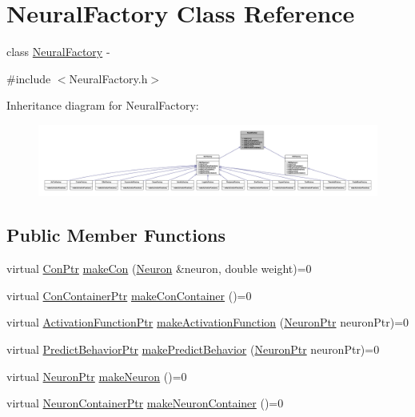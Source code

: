 \hypertarget{class_neural_factory}{
\section{NeuralFactory Class Reference}
\label{class_neural_factory}
}


class \hyperlink{class_neural_factory}{NeuralFactory} -\/  




{\ttfamily \#include $<$NeuralFactory.h$>$}



Inheritance diagram for NeuralFactory:
\nopagebreak
\begin{figure}[H]
\begin{center}
\leavevmode
\includegraphics[width=400pt]{class_neural_factory__inherit__graph}
\end{center}
\end{figure}
\subsection*{Public Member Functions}
\begin{DoxyCompactItemize}
\item 
virtual \hyperlink{_a_m_o_r_e_8h_a169bb8e5f26ce70bf2b10dec2fb5ee50}{ConPtr} \hyperlink{class_neural_factory_a0d11171bb9e5d09544e8d58a9324b923}{makeCon} (\hyperlink{class_neuron}{Neuron} \&neuron, double weight)=0
\item 
virtual \hyperlink{_a_m_o_r_e_8h_a1021dbaf961d1c8da6d58a8566e5778b}{ConContainerPtr} \hyperlink{class_neural_factory_a4fa5f4f57a2551c95481146b1a0c83d7}{makeConContainer} ()=0
\item 
virtual \hyperlink{_a_m_o_r_e_8h_a77602a0277a02e5769c3df0adc669b17}{ActivationFunctionPtr} \hyperlink{class_neural_factory_a678ec16456e5772a2c188c475a78c588}{makeActivationFunction} (\hyperlink{_a_m_o_r_e_8h_ac1ea936c2c7728eb382278131652fef4}{NeuronPtr} neuronPtr)=0
\item 
virtual \hyperlink{_a_m_o_r_e_8h_a1fb2f1f8fdf1e08c42ef4bdce436af93}{PredictBehaviorPtr} \hyperlink{class_neural_factory_a3d49ef5f05c82cc2c614e884ed3a27d5}{makePredictBehavior} (\hyperlink{_a_m_o_r_e_8h_ac1ea936c2c7728eb382278131652fef4}{NeuronPtr} neuronPtr)=0
\item 
virtual \hyperlink{_a_m_o_r_e_8h_ac1ea936c2c7728eb382278131652fef4}{NeuronPtr} \hyperlink{class_neural_factory_a7921519c79b2fb0a5868661fe934f694}{makeNeuron} ()=0
\item 
virtual \hyperlink{_a_m_o_r_e_8h_a6157c259718f98f808c85d7f77048970}{NeuronContainerPtr} \hyperlink{class_neural_factory_ab8fe3634f3715f99616fe9498a29badb}{makeNeuronContainer} ()=0
\end{DoxyCompactItemize}


